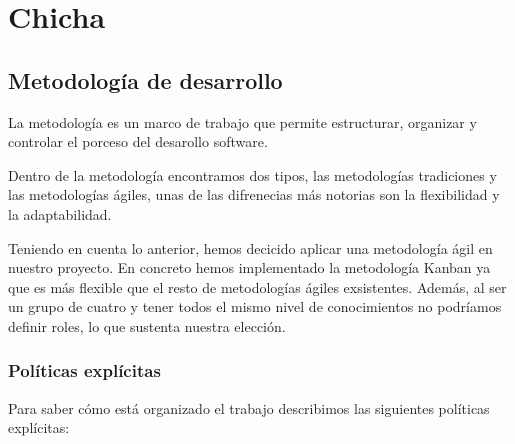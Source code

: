 \chapter{Chicha}
\label{cap:chicha}

\section{Metodología de desarrollo}
La metodología es un marco de trabajo que permite estructurar, organizar y controlar el porceso del desarollo software.

Dentro de la metodología encontramos dos tipos, las metodologías tradiciones y las metodologías ágiles, unas de las difrenecias más notorias son la flexibilidad y la adaptabilidad.

Teniendo en cuenta lo anterior, hemos decicido aplicar una metodología ágil en nuestro proyecto. En concreto hemos implementado la metodología Kanban ya que es más flexible que el resto de metodologías ágiles exsistentes. Además, al ser un grupo de cuatro y tener todos el mismo nivel de conocimientos no podríamos definir roles, lo que sustenta nuestra elección.
\subsection{Políticas explícitas}
Para saber cómo está organizado el trabajo describimos las siguientes políticas explícitas:

